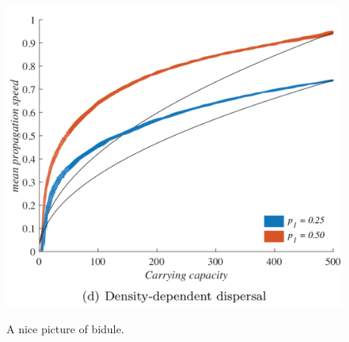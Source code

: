 \documentclass[a4paper]{article}
\begin{document}
\begin{figure}[h]
  \captionsetup{justification=centering}
  \caption{A nice picture of bidule.}
  \centering
  \includegraphics[scale=0.5]{fig.png}
  \label{Fig1}
\end{figure}
\end{document}
